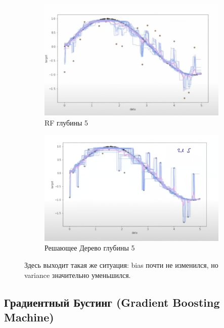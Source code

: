     \begin{figure}
        \begin{subfigure}{0.5\textwidth} %
            \centering
            \includegraphics[width=1\linewidth]{images/10lecture/bvd-bagging-d5.png} %
            \caption{RF глубины 5}
        \end{subfigure}%
        \begin{subfigure}{0.5\textwidth} %
            \centering
            \includegraphics[width=1\linewidth]{images/9lecture/ex4.png} %
            \caption{Решающее Дерево глубины 5}

        \end{subfigure}
        \caption{Здесь выходит такая же ситуация: bias почти не изменился, но variance значительно уменьшился.}
    \end{figure}


    \subsection{Градиентный Бустинг (Gradient Boosting Machine)}

